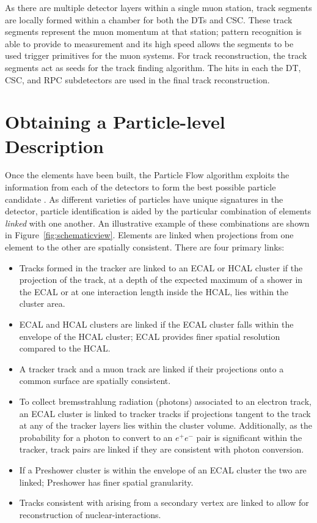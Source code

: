 As there are multiple detector layers within a single muon station, track segments are locally formed within a chamber for both the DTs and CSC. These track segments represent the muon momentum at that station; pattern recognition is able to provide to measurement and its high speed allows the segments to be used trigger primitives for the muon systems. For track reconstruction, the track segments act as seeds for the track finding algorithm. The hits in each the DT, CSC, and RPC subdetectors are used in the final track reconstruction.

\section{Obtaining a Particle-level Description}

Once the elements have been built, the Particle Flow algorithm exploits the information from each of the detectors to form the best possible particle candidate \cite{CMS-PRF-14-001}. As different varieties of particles have unique signatures in the detector, particle identification is aided by the particular combination of elements \textit{linked} with one another. An illustrative example of these combinations are shown in Figure~\ref{fig:schematicview}.  Elements are linked when projections from one element to the other are spatially consistent. There are four primary links:

\begin{itemize}
\item Tracks formed in the tracker are linked to an ECAL or HCAL cluster if the projection of the track, at a depth of the expected maximum of a shower in the ECAL or at one interaction length inside the HCAL, lies within the cluster area.
\item ECAL and HCAL clusters are linked if the ECAL cluster falls within the envelope of the HCAL cluster; ECAL provides finer spatial resolution compared to the HCAL.
\item A tracker track and a muon track are linked if their projections onto a common surface are spatially consistent.
\item To collect bremsstrahlung radiation (photons) associated to an electron track, an ECAL cluster is linked to tracker tracks if projections tangent to the track at any of the tracker layers lies within the cluster volume. Additionally, as the probability for a photon to convert to an $e^{+}e^{-}$ pair is significant within the tracker, track pairs are linked if they are consistent with photon conversion.
\item If a Preshower cluster is within the envelope of an ECAL cluster the two are linked; Preshower has finer spatial granularity.
\item Tracks consistent with arising from a secondary vertex are linked to allow for reconstruction of nuclear-interactions.
\end{itemize}

